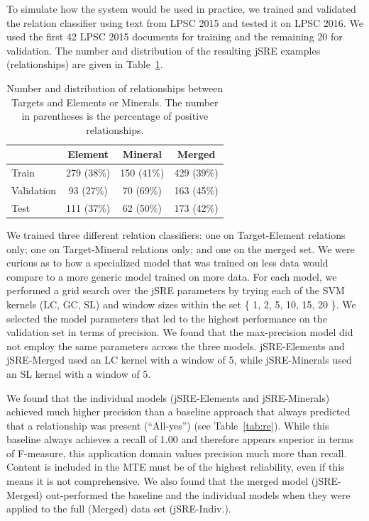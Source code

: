 \documentclass[letterpaper]{article} %
\begin{document}
To simulate how the system would be used in practice, we trained and
validated the relation classifier using text from LPSC 2015 and tested
it on LPSC 2016.  We used the first 42 LPSC 2015 documents for
training and the remaining 20 for validation.  The number and
distribution of the resulting jSRE examples (relationships) are given
in Table~\ref{tab:rels}.  

\begin{table}
\caption{Number and distribution of relationships between Targets and
Elements or Minerals. The number in parentheses is the percentage of
positive relationships. }
\label{tab:rels}
\begin{center}
\begin{tabular}{l|ccc}
           & Element & Mineral & Merged \\ \hline 
Train      & 279 (38\%) & 150 (41\%) & 429 (39\%) \\
Validation &  93 (27\%) &  70 (69\%) & 163 (45\%) \\ \hline
Test       & 111 (37\%) &  62 (50\%) & 173 (42\%) \\ \hline
\end{tabular}
\end{center}
\end{table}

We trained three different relation classifiers: one on Target-Element
relations only; one on Target-Mineral relations only; and one on the
merged set.  We were curious as to how a specialized model that was
trained on less data would compare to a more generic model trained on
more data.  For each model, we performed a grid search over the jSRE
parameters by trying each of the SVM kernels (LC, GC, SL) and window
sizes within the set \{ 1, 2, 5, 10, 15, 20 \}.  We selected the model
parameters that led to the highest performance on the validation set
in terms of precision.  We found that the max-precision model did not
employ the same parameters across the three models.  jSRE-Elements and
jSRE-Merged used an LC kernel with a window of 5, while jSRE-Minerals
used an SL kernel with a window of 5.  

We found that the individual models (jSRE-Elements and jSRE-Minerals)
achieved much higher precision than a baseline approach that always
predicted that a relationship was present (``All-yes'') (see
Table~\ref{tab:re}).  While this baseline always achieves a recall of
1.00 and therefore appears superior in terms of F-measure, this
application domain values precision much more than recall.  Content
is included in the MTE must be of the highest reliability, even if
this means it is not comprehensive.  
%
We also found that the merged model (jSRE-Merged) out-performed the
baseline and the individual models when they were applied to the full
(Merged) data set (jSRE-Indiv.). 
\end{document}
